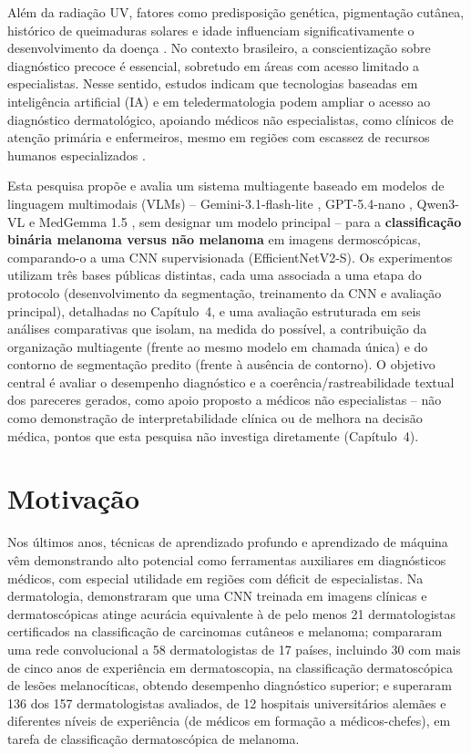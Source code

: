 Além da radiação UV, fatores como predisposição genética, pigmentação cutânea, histórico de queimaduras solares e idade influenciam significativamente o desenvolvimento da doença \cite{shraim2023systematic}. No contexto brasileiro, a conscientização sobre diagnóstico precoce é essencial, sobretudo em áreas com acesso limitado a especialistas. Nesse sentido, estudos indicam que tecnologias baseadas em inteligência artificial (IA) e em teledermatologia podem ampliar o acesso ao diagnóstico dermatológico, apoiando médicos não especialistas, como clínicos de atenção primária e enfermeiros, mesmo em regiões com escassez de recursos humanos especializados \cite{jain2021development,giavinabianchi2020teledermatology}.

Esta pesquisa propõe e avalia um sistema multiagente baseado em modelos de linguagem multimodais (VLMs) -- Gemini-3.1-flash-lite \cite{google2025gemini31}, GPT-5.4-nano \cite{openai2025gpt5nano}, Qwen3-VL \cite{qwen2025qwen3vl} e MedGemma 1.5 \cite{google2025medgemma}, sem designar um modelo principal -- para a \textbf{classificação binária melanoma versus não melanoma} em imagens dermoscópicas, comparando-o a uma CNN supervisionada (EfficientNetV2-S). Os experimentos utilizam três bases públicas distintas, cada uma associada a uma etapa do protocolo (desenvolvimento da segmentação, treinamento da CNN e avaliação principal), detalhadas no Capítulo~4, e uma avaliação estruturada em seis análises comparativas que isolam, na medida do possível, a contribuição da organização multiagente (frente ao mesmo modelo em chamada única) e do contorno de segmentação predito (frente à ausência de contorno). O objetivo central é avaliar o desempenho diagnóstico e a coerência/rastreabilidade textual dos pareceres gerados, como apoio proposto a médicos não especialistas -- não como demonstração de interpretabilidade clínica ou de melhora na decisão médica, pontos que esta pesquisa não investiga diretamente (Capítulo~4).

\section{Motivação}

Nos últimos anos, técnicas de aprendizado profundo e aprendizado de máquina vêm demonstrando alto potencial como ferramentas auxiliares em diagnósticos médicos, com especial utilidade em regiões com déficit de especialistas. Na dermatologia,  demonstraram que uma CNN treinada em imagens clínicas e dermatoscópicas atinge acurácia equivalente à de pelo menos 21 dermatologistas certificados na classificação de carcinomas cutâneos e melanoma;  compararam uma rede convolucional a 58 dermatologistas de 17 países, incluindo 30 com mais de cinco anos de experiência em dermatoscopia, na classificação dermatoscópica de lesões melanocíticas, obtendo desempenho diagnóstico superior; e  superaram 136 dos 157 dermatologistas avaliados, de 12 hospitais universitários alemães e diferentes níveis de experiência (de médicos em formação a médicos-chefes), em tarefa de classificação dermatoscópica de melanoma.
 

